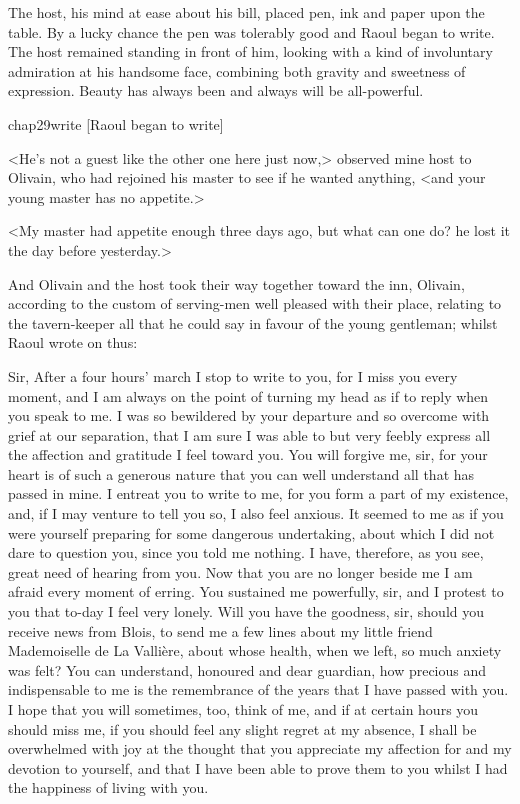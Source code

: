 The host, his mind at ease about his bill, placed pen, ink and paper upon the table. By a lucky chance the pen was tolerably good and Raoul began to write. The host remained standing in front of him, looking with a kind of involuntary admiration at his handsome face, combining both gravity and sweetness of expression. Beauty has always been and always will be all-powerful.

\begin{bwbigpic}
	[\basicscale] 
	{chap29write}
	[Raoul began to write]
\end{bwbigpic}

<He's not a guest like the other one here just now,> observed mine host to Olivain, who had rejoined his master to see if he wanted anything, <and your young master has no appetite.>

<My master had appetite enough three days ago, but what can one do? he lost it the day before yesterday.>

And Olivain and the host took their way together toward the inn, Olivain, according to the custom of serving-men well pleased with their place, relating to the tavern-keeper all that he could say in favour of the young gentleman; whilst Raoul wrote on thus:  

\begin{mail}{}{Sir,}
After a four hours' march I stop to write to you, for I miss you every moment, and I am always on the point of turning my head as if to reply when you speak to me. I was so bewildered by your departure and so overcome with grief at our separation, that I am sure I was able to but very feebly express all the affection and gratitude I feel toward you. You will forgive me, sir, for your heart is of such a generous nature that you can well understand all that has passed in mine. I entreat you to write to me, for you form a part of my existence, and, if I may venture to tell you so, I also feel anxious. It seemed to me as if you were yourself preparing for some dangerous undertaking, about which I did not dare to question you, since you told me nothing. I have, therefore, as you see, great need of hearing from you. Now that you are no longer beside me I am afraid every moment of erring. You sustained me powerfully, sir, and I protest to you that to-day I feel very lonely. Will you have the goodness, sir, should you receive news from Blois, to send me a few lines about my little friend Mademoiselle de La Vallière, about whose health, when we left, so much anxiety was felt? You can understand, honoured and dear guardian, how precious and indispensable to me is the remembrance of the years that I have passed with you. I hope that you will sometimes, too, think of me, and if at certain hours you should miss me, if you should feel any slight regret at my absence, I shall be overwhelmed with joy at the thought that you appreciate my affection for and my devotion to yourself, and that I have been able to prove them to you whilst I had the happiness of living with you.
\end{mail}

